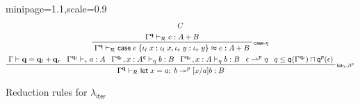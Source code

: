 \documentclass[acmsmall,screen,anonymous,review]{acmart}
\newcommand{\mc}[1]{\ensuremath{\mathcal{#1}}}
\newcommand{\mb}[1]{\ensuremath{\mathbf{#1}}}
\newcommand{\ms}[1]{\ensuremath{\mathsf{#1}}}
\newcommand{\lto}{:}
\newcommand{\linl}[1]{\iota_l\;{#1}}
\newcommand{\linr}[1]{\iota_r\;{#1}}
\newcommand{\letexpr}[3]{\ensuremath{\ms{let}\;#1 = #2;\;#3}}
\newcommand{\caseexpr}[5]{\ms{case}\;#1\;\{\linl{#2} \lto #3, \linr{#4} \lto #5\}}
\newcommand{\qsp}[4]{#1 \vdash #2 = #3 + #4}
\newcommand{\rle}[1]{{\scriptsize\textsf{#1}}}
\newcommand{\hasty}[4]{#1 \vdash_{#2} #3: {#4}}
\newcommand{\teqv}{\approx}
\newcommand{\tref}{\twoheadrightarrow}
\newcommand{\tmlep}[6]{#1 \vdash_{#2} #3 \tref^{#6} #4 : {#5}}
\newcommand{\tmeq}[5]{#1 \vdash_{#2} #3 \teqv #4 : {#5}}
\newcommand{\subiterexp}{\texorpdfstring{\(\lambda_{\ms{iter}}\)}{lambda-iter}}
\newcommand{\rightmove}{\rightharpoonup}
\newcommand{\alquant}{\ms{q}}
\begin{document}
\begin{figure}
\begin{adjustbox}{minipage=1.1\textwidth,scale=0.9}
\begin{gather*}
{        {C}
      } \\
    \prftree[r]{\rle{case-$\eta$}}
      {\hasty{\Gamma^{\mb{q}}}{\mc{R}}{e}{A + B}}
      {\tmeq{\Gamma^{\mb{q}}}{\mc{R}}
        {\caseexpr{e}{x}{\linl{x}}{y}{\linr{y}}}
        {e}
        {A + B}
      } \\
    \prftree[r]{\rle{let$_1$-$\beta^p$}}
      {\qsp{\Gamma}{\mb{q}}{\mb{q}_l}{\mb{q}_r}}
      {\hasty{\Gamma^{\mb{q}_l}}{\epsilon}{a}{A}}
      {\hasty{\Gamma^{\mb{q}_r}, x : A^q}{\eta}{b}{B}}
      {\hasty{\Gamma^{\mb{q}_r}, x : A}{\eta}{b}{B}}
      {\epsilon \rightmove^p \eta}
      {q \leq \alquant(\Gamma^{\mb{q}_l}) \sqcap \alquant^p(\epsilon)}
      {
        \tmlep{\Gamma^{\mb{q}}}{\mc{R}}{\letexpr{x}{a}{b}}{[x/a]b}{B}{p}
      }
  \end{gather*}
  \end{adjustbox}
  \caption{Reduction rules for \subiterexp{}}
  \Description{}
  \label{fig:reduction-rules}
\end{figure}
\end{document}
